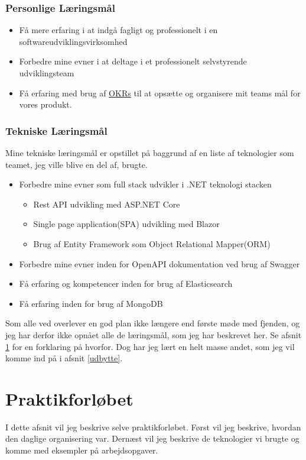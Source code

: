 \documentclass[a4paper]{article}
\begin{document}
\subsubsection{Personlige Læringsmål}
\label{personligelaeringsmaal}
\begin{itemize}
    \item Få mere erfaring i at indgå fagligt og professionelt i en 
    softwareudviklingsvirksomhed
    \item Forbedre mine evner i at deltage i et professionelt selvstyrende 
    udviklingsteam
    \item Få erfaring med brug af \href{https://en.wikipedia.org/wiki/OKR}{OKRs}
     til at opsætte og organisere mit teams mål for vores produkt.
\end{itemize}

\subsubsection{Tekniske Læringsmål}
Mine tekniske læringsmål er opstillet på baggrund af en liste af teknologier
som teamet, jeg ville blive en del af, brugte.

\begin{itemize}
    \item Forbedre mine evner som full stack udvikler i .NET teknologi stacken
    \begin{itemize}
        \item Rest API udvikling med ASP.NET Core
        \item Single page application(SPA) udvikling med Blazor
        \item Brug af Entity Framework som Object Relational Mapper(ORM)
    \end{itemize}
    \item Forbedre mine evner inden for OpenAPI dokumentation ved brug af
    Swagger
    \item Få erfaring og kompetencer inden for brug af Elasticsearch
    \item Få erfaring inden for brug af MongoDB
\end{itemize}

Som alle ved overlever en god plan ikke længere end første møde med fjenden,
og jeg har derfor ikke opnået alle de læringsmål, som jeg har beskrevet her.
Se afsnit \ref{praktikforloeb} for en forklaring på hvorfor.
Dog har jeg lært en helt masse andet, 
som jeg vil komme ind på i afsnit \ref{udbytte}.

\newpage
\section{Praktikforløbet}
\label{praktikforloeb}
I dette afsnit vil jeg beskrive selve praktikforløbet.
Først vil jeg beskrive, hvordan den daglige organisering var.
Dernæst vil jeg beskrive de teknologier vi brugte og komme med eksempler på arbejdsopgaver.
\end{document}
